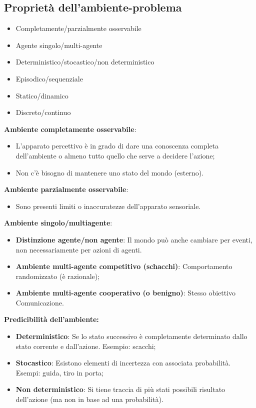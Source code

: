\documentclass[../main.tex]{subfiles}
\begin{document}
	\subsection{Proprietà dell’ambiente-problema}
	\begin{itemize}
		\item Completamente/parzialmente osservabile
		\item Agente singolo/multi-agente
		\item Deterministico/stocastico/non deterministico
		\item Episodico/sequenziale
		\item Statico/dinamico
		\item Discreto/continuo
	\end{itemize}
	\textbf{Ambiente completamente osservabile}:
	\begin{itemize}
		\item L’apparato percettivo è in grado di dare una conoscenza completa dell’ambiente o almeno tutto quello che serve a decidere l’azione;
		\item Non c’è bisogno di mantenere uno stato del mondo (esterno).
	\end{itemize}
	\textbf{Ambiente parzialmente osservabile}:
	\begin{itemize}
		\item Sono presenti limiti o inaccuratezze dell’apparato sensoriale.
	\end{itemize}
	\textbf{Ambiente singolo/multiagente}:
	\begin{itemize}
		\item \textbf{Distinzione agente/non agente}: Il mondo può anche cambiare per eventi, non necessariamente per azioni di agenti.
		\item \textbf{Ambiente multi-agente competitivo (schacchi)}: Comportamento randomizzato (è razionale);
		\item \textbf{Ambiente multi-agente cooperativo (o benigno)}: Stesso obiettivo Comunicazione.
	\end{itemize}
	\textbf{Predicibilità dell’ambiente:}
	\begin{itemize}
		\item \textbf{Deterministico}: Se lo stato successivo è completamente determinato dallo stato corrente e dall’azione. Esempio: scacchi;
		\item \textbf{Stocastico}: Esistono elementi di incertezza con associata probabilità. Esempi: guida, tiro in porta;
		\item \textbf{Non deterministico}: Si tiene traccia di più stati possibili risultato dell’azione (ma non in base ad una probabilità).
	\end{itemize}
\end{document}
